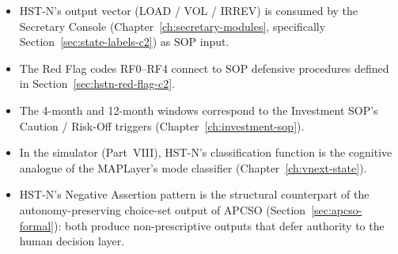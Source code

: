 \begin{itemize}
\item HST-N's output vector (LOAD / VOL / IRREV) is consumed by
the Secretary Console (Chapter~\ref{ch:secretary-modules},
specifically Section~\ref{sec:state-labels-c2}) as SOP input.
\item The Red Flag codes RF0--RF4 connect to SOP defensive
procedures defined in
Section~\ref{sec:hstn-red-flag-c2}.
\item The 4-month and 12-month windows correspond to the
Investment SOP's Caution / Risk-Off triggers
(Chapter~\ref{ch:investment-sop}).
\item In the simulator (Part~VIII), HST-N's classification function
is the cognitive analogue of the MAPLayer's mode classifier
(Chapter~\ref{ch:vnext-state}).
\item HST-N's Negative Assertion pattern is the structural
counterpart of the autonomy-preserving choice-set output of APCSO
(Section~\ref{sec:apcso-formal}): both produce non-prescriptive
outputs that defer authority to the human decision layer.
\end{itemize}
